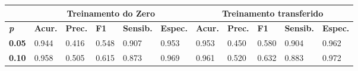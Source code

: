 \begin{table}

    \begin{small}
    \begin{tabular}{l|l|l|l|l|l|l|l|l|l|l}
    \rowcolor[HTML]{EFEFEF} \multicolumn{1}{c}{\cellcolor[HTML]{FFFFFF} } & \multicolumn{5}{c|}{\textbf{Treinamento do Zero}} & \multicolumn{5}{|c}{\textbf{Treinamento transferido}} \\ 
    \cline{1-11}
    \cline{1-11}
    \hline
    \textbf{\textit{p}}                     & \textbf{Acur.}                                & \textbf{Prec.}                              & \textbf{F1}                                       & \textbf{Sensib.}                                 & \textbf{Espec.}                               &\textbf{Acur.}                                 & \textbf{Prec.}                              & \textbf{F1}                                      & \textbf{Sensib.}                                 & \textbf{Espec.}     \\ \hline
    \cellcolor[HTML]{EFEFEF}\textbf{0.05}   & \cellcolor[HTML]{FFEEEE}0.944                 & \cellcolor[HTML]{FFEEEE}0.416               & \cellcolor[HTML]{FFEEEE}0.548                     & \cellcolor[HTML]{FFEEEE}0.907                    & \cellcolor[HTML]{FFEEEE}0.953                 & \cellcolor[HTML]{EEFFEE}0.953                 & \cellcolor[HTML]{EEFFEE}0.450               & \cellcolor[HTML]{EEFFEE}0.580                    & \cellcolor[HTML]{EEFFEE}0.904                    & \cellcolor[HTML]{EEFFEE}0.962                       \\ \cline{1-11}
    \cellcolor[HTML]{EFEFEF}\textbf{0.10}   & \cellcolor[HTML]{FFEEEE}0.958                 & \cellcolor[HTML]{FFEEEE}0.505               & \cellcolor[HTML]{FFEEEE}0.615                     & \cellcolor[HTML]{FFEEEE}0.873                    & \cellcolor[HTML]{FFEEEE}0.969                 & \cellcolor[HTML]{EEFFEE}0.961                 & \cellcolor[HTML]{EEFFEE}0.520               & \cellcolor[HTML]{EEFFEE}0.632                    & \cellcolor[HTML]{EEFFEE}0.883                    & \cellcolor[HTML]{EEFFEE}0.972                       \\ \cline{1-11}

\end{tabular}
\end{small}
\end{table}
